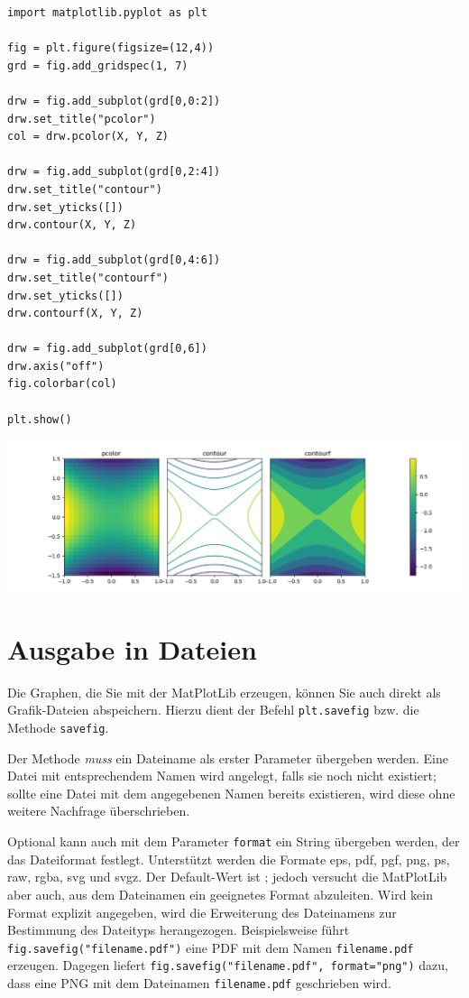 \begin{codebox}
\begin{verbatim}
import matplotlib.pyplot as plt

fig = plt.figure(figsize=(12,4))
grd = fig.add_gridspec(1, 7)

drw = fig.add_subplot(grd[0,0:2])
drw.set_title("pcolor")
col = drw.pcolor(X, Y, Z)

drw = fig.add_subplot(grd[0,2:4])
drw.set_title("contour")
drw.set_yticks([])
drw.contour(X, Y, Z)

drw = fig.add_subplot(grd[0,4:6])
drw.set_title("contourf")
drw.set_yticks([])
drw.contourf(X, Y, Z)

drw = fig.add_subplot(grd[0,6])
drw.axis("off")
fig.colorbar(col)

plt.show()
\end{verbatim}
\end{codebox}
%
\begin{tcolorbox}[title=Ausgabe: Darstellung in Falschfarben und als Kontourplot]
	\includegraphics[width=\linewidth]{./gfx/plt-falseColour}
\end{tcolorbox}

\section{Ausgabe in Dateien}
Die Graphen, die Sie mit der MatPlotLib erzeugen, können Sie auch direkt als Grafik-Dateien abspeichern. Hierzu dient der Befehl \texttt{plt.savefig} bzw. die Methode \texttt{savefig}.

Der Methode \emph{muss} ein Dateiname als erster Parameter übergeben werden. Eine Datei mit entsprechendem Namen wird angelegt, falls sie noch nicht existiert; sollte eine Datei mit dem angegebenen Namen bereits existieren, wird diese ohne weitere Nachfrage überschrieben.

Optional kann auch mit dem Parameter \texttt{format} ein String übergeben werden, der das Dateiformat festlegt. Unterstützt werden die Formate eps, pdf, pgf, png, ps, raw, rgba, svg und svgz. Der Default-Wert ist ; jedoch versucht die MatPlotLib aber auch, aus dem Dateinamen ein geeignetes Format abzuleiten. Wird kein Format explizit angegeben, wird die Erweiterung des Dateinamens zur Bestimmung des Dateityps herangezogen. Beispielsweise führt \texttt{fig.savefig("filename.pdf")} eine PDF mit dem Namen \texttt{filename.pdf} erzeugen. Dagegen liefert \texttt{fig.savefig("filename.pdf", format="png")} dazu, dass eine PNG mit dem Dateinamen \texttt{filename.pdf} geschrieben wird.


